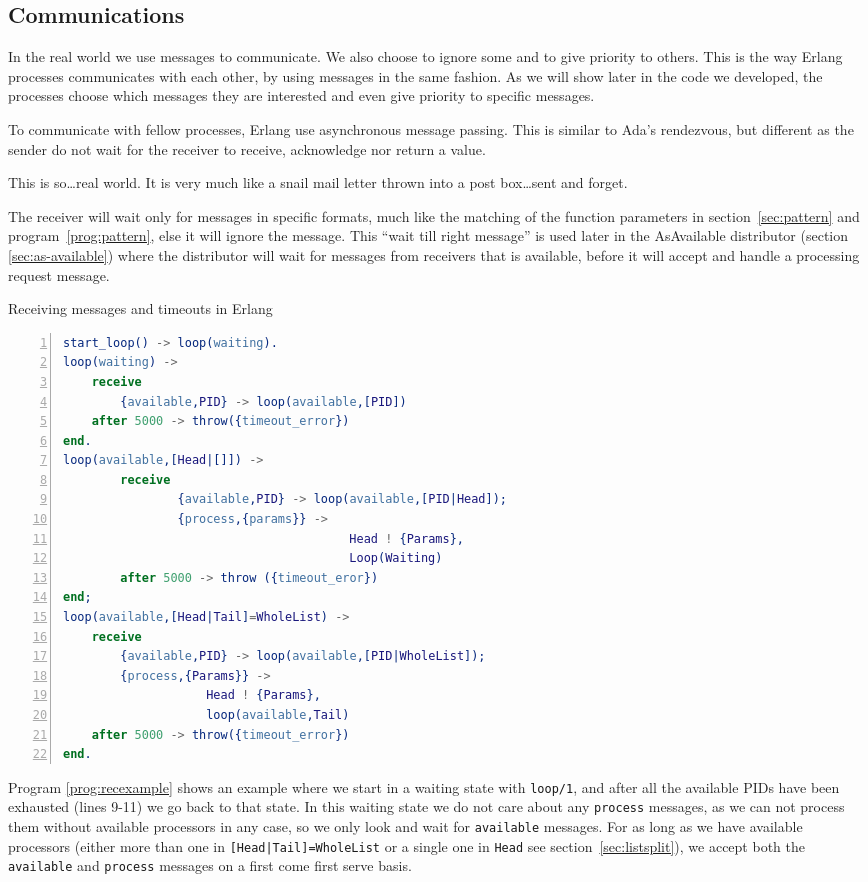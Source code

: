 \documentclass[a4paper,11pt]{report}
\begin{document}
\subsection{Communications}
\label{sec:communications}

In the real world we use messages to communicate. We also choose to
ignore some and to give priority to others. This is the way Erlang
processes communicates with each other, by using messages in the same
fashion. As we will show later in the code we developed, the processes
choose which messages they are interested and even give priority to
specific messages.

To communicate with fellow processes, Erlang use asynchronous message
passing. This is similar to Ada's rendezvous, but different as the
sender do not wait for the receiver to receive, acknowledge nor return
a value.

 This is so\ldots real world. It is very much like a
snail mail letter thrown into a post box\ldots sent and forget.

The receiver will wait only for messages in specific formats, much
like the matching of the function parameters in
section~\autoref{sec:pattern} and program~\autoref{prog:pattern}, else it will
ignore the message. This ``wait till right message'' is used later in
the AsAvailable distributor (section \autoref{sec:as-available}) where the
distributor will wait for messages from receivers that is available,
before it will accept and handle a processing request message.
\begin{Program}[tbh]
\caption{Receiving messages and timeouts in Erlang}
\label{prog:recexample}
\begin{lstlisting}[language=erlang,numbers=left,numberstyle=\tiny]
start_loop() -> loop(waiting).
loop(waiting) ->
	receive
		{available,PID} -> loop(available,[PID])
	after 5000 -> throw({timeout_error})
end.
loop(available,[Head|[]]) ->
        receive
                {available,PID} -> loop(available,[PID|Head]);
                {process,{params}} ->
                                        Head ! {Params},
                                        Loop(Waiting)
        after 5000 -> throw ({timeout_eror})
end;
loop(available,[Head|Tail]=WholeList) ->
	receive
		{available,PID} -> loop(available,[PID|WholeList]);
		{process,{Params}} ->
					Head ! {Params},
					loop(available,Tail)
	after 5000 -> throw({timeout_error})
end.
\end{lstlisting}
\end{Program} Program \autoref{prog:recexample} shows an example where we
start in a waiting state with \texttt{loop/1}, and after all the
available PIDs have been exhausted (lines 9-11) we go back to that
state. In this waiting state we do not care about any \texttt{process}
messages, as we can not process them without available processors in any case, so we only look and
wait for \texttt{available} messages. For as long as we have available
processors (either more than one in \texttt{[Head|Tail]=WholeList} or
a single one in \texttt{Head} see section~\autoref{sec:listsplit}), we accept both the
\texttt{available} and \texttt{process} messages on a first come first
serve basis.
\end{document}
